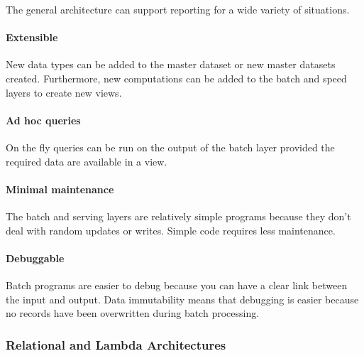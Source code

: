 \documentclass[
]{article}
\begin{document}
The general architecture can support reporting for a wide variety of
situations.

\hypertarget{extensible}{%
\paragraph*{Extensible}\label{extensible}}

New data types can be added to the master dataset or new master datasets
created. Furthermore, new computations can be added to the batch and
speed layers to create new views.

\hypertarget{ad-hoc-queries}{%
\paragraph*{Ad hoc queries}\label{ad-hoc-queries}}

On the fly queries can be run on the output of the batch layer provided
the required data are available in a view.

\hypertarget{minimal-maintenance}{%
\paragraph*{Minimal maintenance}\label{minimal-maintenance}}

The batch and serving layers are relatively simple programs because they
don't deal with random updates or writes. Simple code requires less
maintenance.

\hypertarget{debuggable}{%
\paragraph*{Debuggable}\label{debuggable}}

Batch programs are easier to debug because you can have a clear link
between the input and output. Data immutability means that debugging is
easier because no records have been overwritten during batch processing.

\hypertarget{relational-and-lambda-architectures}{%
\subsubsection*{Relational and Lambda Architectures}\label{relational-and-lambda-architectures}}
\end{document}
